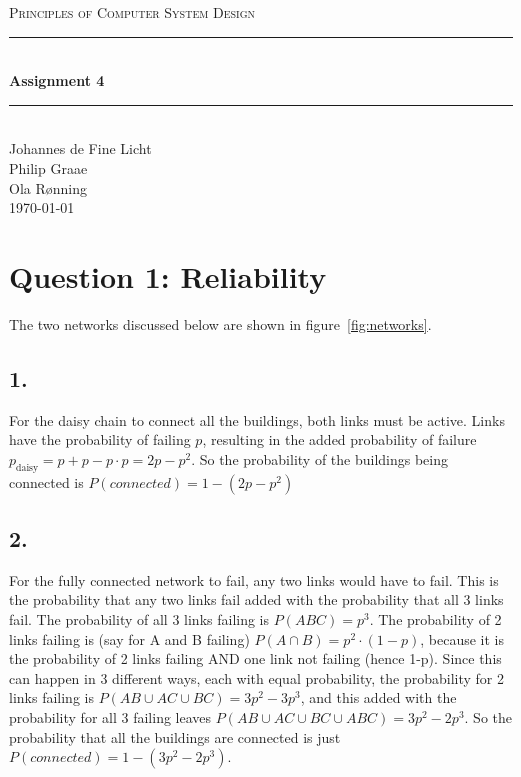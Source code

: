 \documentclass[12pt]{article}
\newcommand{\HRule}{\rule{\linewidth}{0.5mm}}
\begin{document}
\begin{center}
\textsc{\LARGE Principles of Computer System Design}\\[0.3cm] %
\HRule \\[0.4cm]
{ \huge \bfseries Assignment 4}
\HRule \\[0.4cm]
\large
Johannes de Fine Licht
\\Philip Graae
\\Ola Rønning
\\\today
\end{center}

\section*{Question 1: Reliability}

The two networks discussed below are shown in figure~\ref{fig:networks}.

\subsection*{1.}

For the daisy chain to connect all the buildings, both links must be active. Links have the probability of failing $p$, resulting in the added probability of failure $p_\text{daisy} = p + p - p\cdot p = 2p - p^2$. So the probability of the buildings being connected is $P(connected) = 1 - (2p - p^2)$

\subsection*{2.}


For the fully connected network to fail, any two links would have to fail. This is the probability that any two links fail added with the probability that all 3 links fail. The probability of all 3 links failing is $P(ABC) = p^{3}$. The probability of 2 links failing is (say for A and B failing) $P(A\cap B) = p^{2}\cdot(1-p)$, because it is the probability of 2 links failing AND one link not failing (hence 1-p). Since this can happen in 3 different ways, each with equal probability, the probability for 2 links failing is $P(AB \cup AC \cup BC) = 3p^2 - 3p^3$, and this added with the probability for all 3 failing leaves $P(AB \cup AC \cup BC \cup ABC) = 3p^2 - 2p^3$. So the probability that all the buildings are connected is just $P(connected) = 1 - (3p^2 - 2p^3)$.
\end{document}
